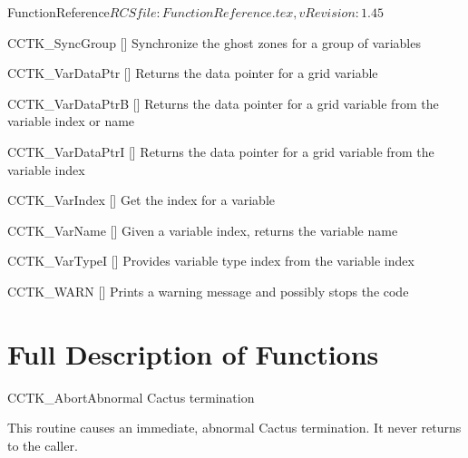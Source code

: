 \begin{cactuspart}{5}{FunctionReference}{$RCSfile: FunctionReference.tex,v $}{$Revision: 1.45 $}
\begin{Lentry}
\item[CCTK\_SyncGroup]
  [\pageref{CCTK-SyncGroup}]
  Synchronize the ghost zones for a group of variables

\item[CCTK\_VarDataPtr]
  [\pageref{CCTK-VarDataPtr}]
  Returns the data pointer for a grid variable

\item[CCTK\_VarDataPtrB]
  [\pageref{CCTK-VarDataPtrB}]
  Returns the data pointer for a grid variable from the variable index or name

\item[CCTK\_VarDataPtrI]
  [\pageref{CCTK-VarDataPtrI}]
  Returns the data pointer for a grid variable from the variable index

\item[CCTK\_VarIndex]
   [\pageref{CCTK-VarIndex}]
  Get the index for a variable

\item[CCTK\_VarName]
  [\pageref{CCTK-VarName}]
  Given a variable index, returns the variable name

\item[CCTK\_VarTypeI]
  [\pageref{CCTK-VarTypeI}]
  Provides variable type index from the variable index

\item[CCTK\_WARN]
  [\pageref{CCTK-WARN}]
  Prints a warning message and possibly stops the code

\end{Lentry}


\section{Full Description of Functions}



\begin{CCTKFunc}{CCTK\_Abort}{Abnormal Cactus termination}
\label{CCTK-Abort}
\showargs
\begin{params}
\end{params}
\begin{discussion}
This routine causes an immediate, abnormal Cactus termination.
It never returns to the caller.
\end{discussion}
\end{CCTKFunc}






\end{cactuspart}
